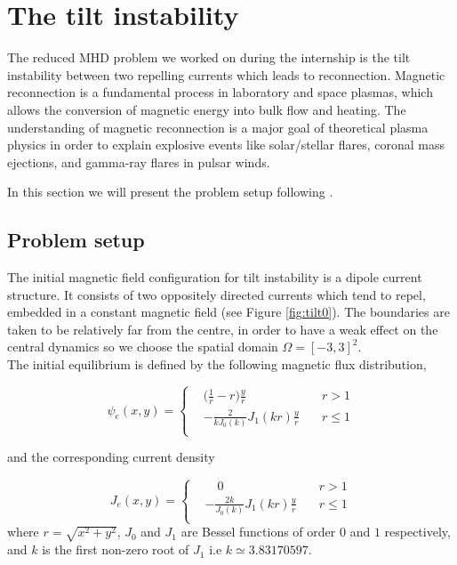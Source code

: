 \documentclass[12pt,openany]{amsbook}
\begin{document}
\section{The tilt instability}

The reduced MHD problem we worked on during the internship is the tilt instability between two repelling
currents which leads to reconnection. Magnetic reconnection is a fundamental process in laboratory and space plasmas, 
which allows the conversion of
magnetic energy into bulk flow and heating. The understanding of magnetic reconnection is a major goal of theoretical
plasma physics in order to explain explosive events like solar/stellar flares, coronal mass ejections, and gamma-ray
flares in pulsar winds.

In this section we will present the problem setup following \cite{Baty_2019}.

\subsection{Problem setup}

The initial magnetic field configuration for tilt instability is a dipole current structure. 
It consists of two oppositely directed currents  which tend to repel, 
embedded in a constant magnetic field (see Figure \ref{fig:tilt0}). 
The boundaries are taken to be relatively far from the centre, in order to have a weak
effect on the central dynamics so we choose the spatial domain $\Omega = [-3 , 3]^2$.\\

The initial equilibrium is defined by the following magnetic flux distribution,

\begin{equation}
    \psi_e(x,y) = \left\{
        \begin{aligned}
           & \Big( \frac{1}{r} - r \Big)\frac{y}{r} \quad &r>1 \\
           & - \frac{2}{kJ_0(k)}J_1(kr)\frac{y}{r} \quad &r\leq 1 \\
        \end{aligned}
      \right.
\end{equation}

and the corresponding current density

\begin{equation}
    J_e(x,y) = \left\{
        \begin{aligned}
           & \quad 0 \quad &r>1 \\
           & - \frac{2k}{J_0(k)}J_1(kr)\frac{y}{r} \quad &r\leq 1 \\
        \end{aligned}
      \right.
\end{equation}
where $r = \sqrt{x^2 + y^2}$, $J_0$ and $J_1$ are Bessel functions of order $0$ and $1$ respectively, 
and $k$ is the first non-zero root of $J_1$ i.e $k \simeq 3.83170597$.\\
\end{document}
